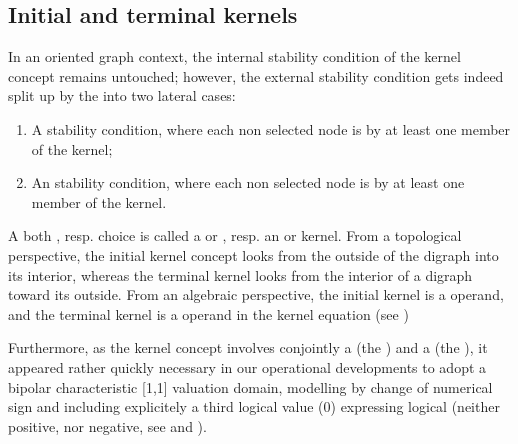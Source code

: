 \documentclass[a4paper,10pt,english]{sphinxhowto}
\begin{document}
\subsection{Initial and terminal kernels}
\label{\detokenize{tutorial:initial-and-terminal-kernels}}
In an oriented graph context, the internal stability condition of the kernel concept remains untouched; however, the external stability condition gets indeed split up by the  into two lateral cases:
\begin{enumerate}
%
\item {} 
A  stability condition, where each non selected node is  by at least one member of the kernel;

\item {} 
An  stability condition, where each non selected node is  by at least one member of the kernel.

\end{enumerate}

A both   , resp.  choice is called a  or , resp. an  or  kernel. From a topological perspective, the initial kernel concept looks from the outside of the digraph into its interior, whereas the terminal kernel looks from the interior of a digraph toward its outside. From an algebraic perspective, the initial kernel is a  operand, and the terminal kernel is a  operand in the  kernel equation (see  )

Furthermore, as the kernel concept involves conjointly a  (the ) and a  (the ), it appeared rather quickly necessary in our operational developments to adopt a bipolar characteristic {[}\sphinxhyphen{}1,1{]} valuation domain, modelling  by change of numerical sign and including explicitely a third  logical value (0) expressing logical  (neither positive, nor negative, see  and ).
\end{document}
